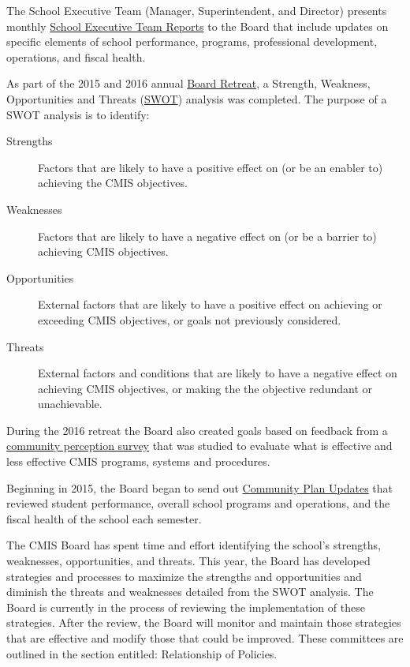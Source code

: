 \begin{findings}
The School Executive Team (Manager, Superintendent, and Director) presents monthly \href{https://docs.google.com/document/d/1gz3SiCiPUMU9n-JgGqzGQhgl0r0qAdpSfQPtBK-rwyI/edit}{School Executive Team Reports} to the Board that include updates on specific elements of school performance, programs, professional development, operations, and fiscal health. 

As part of the 2015 and 2016 annual \href{https://drive.google.com/a/cmis.ac.th/file/d/0B-CVlEN-TDChSTJ6QzdQQUczT0k/view?usp=sharing}{Board Retreat}, a Strength, Weakness, Opportunities and Threats (\href{https://drive.google.com/a/cmis.ac.th/file/d/0B-CVlEN-TDChNVJudnJBNnZveTQ/view?usp=sharing}{SWOT}) analysis was completed. The purpose of a SWOT analysis is to identify:

\begin{description}
\item [Strengths] Factors that are likely to have a positive effect on (or be an enabler to) achieving the CMIS objectives.
\item [Weaknesses] Factors that are likely to have a negative effect on (or be a barrier to) achieving CMIS objectives.
\item [Opportunities] External factors that are likely to have a positive effect on achieving or exceeding CMIS objectives, or goals not previously considered.
\item [Threats] External factors and conditions that are likely to have a negative effect on achieving CMIS objectives, or making the the objective redundant or unachievable.
\end{description}

During the 2016 retreat the Board also created goals based on feedback from a \href{https://docs.google.com/a/cmis.ac.th/document/d/1QoHZUrC_PbxitA2t_ZGH8DidxTLVe46HSl9otFPnE4k/edit?usp=sharing}{community perception survey} that was studied to evaluate what is effective and less effective CMIS programs, systems and procedures.

Beginning in 2015, the Board began to send out \href{https://docs.google.com/a/cmis.ac.th/document/d/16DVRIWxzKBgzVMqk8coHlO97SFWthAA_DEx4z6WSHQs/edit?usp=sharing}{Community Plan Updates} that reviewed student performance, overall school programs and operations, and the fiscal health of the school each semester.  


The CMIS Board has spent time and effort identifying the school’s strengths, weaknesses, opportunities, and threats. This year, the Board has developed strategies and processes to maximize the strengths and opportunities and diminish the threats and weaknesses detailed from the SWOT analysis. The Board is currently in the process of reviewing the implementation of these strategies. After the review, the Board will monitor and maintain those strategies that are effective and modify those that could be improved. These committees are outlined in the section entitled: Relationship of Policies. 
\end{findings}

